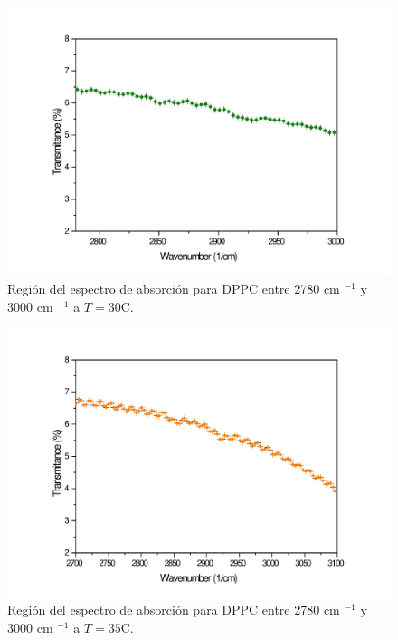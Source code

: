 \documentclass[%
 reprint,
 amsmath,amssymb,
 aps,
]{revtex4-1}
\begin{document}
\begin{figure}[ht]
\includegraphics[scale=0.25]{FTIR/30C.pdf}
  \caption{Región del espectro de absorción para DPPC entre 2780 cm $^{-1}$ y 3000 cm $^{-1}$ a $T=30$\textdegree C.}
  \label{fig:espa30}
\end{figure}
\begin{figure}[ht]
\includegraphics[scale=0.25]{FTIR/35C.pdf}
  \caption{Región del espectro de absorción para DPPC entre 2780 cm $^{-1}$ y 3000 cm $^{-1}$ a $T=35$\textdegree C.}
  \label{fig:espa35}
\end{figure}
\end{document}

